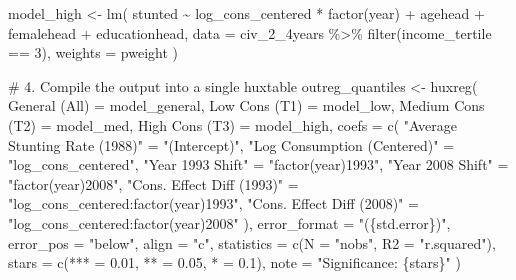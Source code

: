 \documentclass[
  letterpaper,
  DIV=11,
  numbers=noendperiod]{scrartcl}
\newenvironment{Shaded}{\begin{snugshade}}{\end{snugshade}}
\newcommand{\AttributeTok}[1]{\textcolor[rgb]{0.40,0.45,0.13}{#1}}
\newcommand{\CommentTok}[1]{\textcolor[rgb]{0.37,0.37,0.37}{#1}}
\newcommand{\DecValTok}[1]{\textcolor[rgb]{0.68,0.00,0.00}{#1}}
\newcommand{\FloatTok}[1]{\textcolor[rgb]{0.68,0.00,0.00}{#1}}
\newcommand{\FunctionTok}[1]{\textcolor[rgb]{0.28,0.35,0.67}{#1}}
\newcommand{\NormalTok}[1]{\textcolor[rgb]{0.00,0.23,0.31}{#1}}
\newcommand{\OtherTok}[1]{\textcolor[rgb]{0.00,0.23,0.31}{#1}}
\newcommand{\SpecialCharTok}[1]{\textcolor[rgb]{0.37,0.37,0.37}{#1}}
\newcommand{\StringTok}[1]{\textcolor[rgb]{0.13,0.47,0.30}{#1}}
\begin{document}
\begin{Shaded}
\begin{Highlighting}[]
\NormalTok{model\_high }\OtherTok{\textless{}{-}} \FunctionTok{lm}\NormalTok{(}
\NormalTok{  stunted }\SpecialCharTok{\textasciitilde{}}\NormalTok{ log\_cons\_centered }\SpecialCharTok{*} \FunctionTok{factor}\NormalTok{(year) }\SpecialCharTok{+}\NormalTok{ agehead }\SpecialCharTok{+}\NormalTok{ femalehead }\SpecialCharTok{+}\NormalTok{ educationhead, }
  \AttributeTok{data =}\NormalTok{ civ\_2\_4years }\SpecialCharTok{\%\textgreater{}\%} \FunctionTok{filter}\NormalTok{(income\_tertile }\SpecialCharTok{==} \DecValTok{3}\NormalTok{), }
  \AttributeTok{weights =}\NormalTok{ pweight}
\NormalTok{)}

\CommentTok{\# 4. Compile the output into a single huxtable}
\NormalTok{outreg\_quantiles }\OtherTok{\textless{}{-}} \FunctionTok{huxreg}\NormalTok{(}
  \StringTok{\textasciigrave{}}\AttributeTok{General (All)}\StringTok{\textasciigrave{}} \OtherTok{=}\NormalTok{ model\_general,}
  \StringTok{\textasciigrave{}}\AttributeTok{Low Cons (T1)}\StringTok{\textasciigrave{}} \OtherTok{=}\NormalTok{ model\_low,}
  \StringTok{\textasciigrave{}}\AttributeTok{Medium Cons (T2)}\StringTok{\textasciigrave{}} \OtherTok{=}\NormalTok{ model\_med,}
  \StringTok{\textasciigrave{}}\AttributeTok{High Cons (T3)}\StringTok{\textasciigrave{}} \OtherTok{=}\NormalTok{ model\_high,}
  \AttributeTok{coefs =} \FunctionTok{c}\NormalTok{(}
    \StringTok{"Average Stunting Rate (1988)"} \OtherTok{=} \StringTok{"(Intercept)"}\NormalTok{,}
    \StringTok{"Log Consumption (Centered)"} \OtherTok{=} \StringTok{"log\_cons\_centered"}\NormalTok{,}
    \StringTok{"Year 1993 Shift"} \OtherTok{=} \StringTok{"factor(year)1993"}\NormalTok{,}
    \StringTok{"Year 2008 Shift"} \OtherTok{=} \StringTok{"factor(year)2008"}\NormalTok{,}
    \StringTok{"Cons. Effect Diff (1993)"} \OtherTok{=} \StringTok{"log\_cons\_centered:factor(year)1993"}\NormalTok{,}
    \StringTok{"Cons. Effect Diff (2008)"} \OtherTok{=} \StringTok{"log\_cons\_centered:factor(year)2008"}
\NormalTok{  ),}
  \AttributeTok{error\_format =} \StringTok{"(\{std.error\})"}\NormalTok{,}
  \AttributeTok{error\_pos =} \StringTok{"below"}\NormalTok{,}
  \AttributeTok{align =} \StringTok{"c"}\NormalTok{,}
  \AttributeTok{statistics =} \FunctionTok{c}\NormalTok{(}\AttributeTok{N =} \StringTok{"nobs"}\NormalTok{, }\AttributeTok{R2 =} \StringTok{"r.squared"}\NormalTok{),}
  \AttributeTok{stars =} \FunctionTok{c}\NormalTok{(}\StringTok{\textasciigrave{}}\AttributeTok{***}\StringTok{\textasciigrave{}} \OtherTok{=} \FloatTok{0.01}\NormalTok{, }\StringTok{\textasciigrave{}}\AttributeTok{**}\StringTok{\textasciigrave{}} \OtherTok{=} \FloatTok{0.05}\NormalTok{, }\StringTok{\textasciigrave{}}\AttributeTok{*}\StringTok{\textasciigrave{}} \OtherTok{=} \FloatTok{0.1}\NormalTok{),}
  \AttributeTok{note =} \StringTok{"Significance: \{stars\}"}
\NormalTok{)}


\end{Highlighting}
\end{Shaded}
\end{document}
